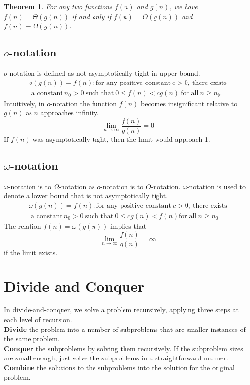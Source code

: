 \documentclass[]{book}
\newtheorem{theorem}{Theorem}[chapter]
\begin{document}
    \begin{theorem}
      For any two functions $f(n)$ and $g(n)$, we have $f(n) = \Theta(g(n))$
      if and only if $f(n) = O(g(n))$ and $f(n) = \Omega(g(n))$.
    \end{theorem}

    \section{$o$-notation}
      $o$-notation is defined as not asymptotically tight in upper bound.
      \begin{multline*}
        o(g(n)) = f(n): \text{for any positive constant}\ c > 0,\ \text{there exists}\\\text{ a constant}\
        n_0 > 0\ \text{such that}\ 0 \leq f(n) < cg(n)\ \text{for all}\ n \geq n_0.
      \end{multline*}
      Intuitively, in $o$-notation the function $f(n)$ becomes insignificant relative
      to $g(n)$ as $n$ approaches infinity.
      $$\lim_{n\to\infty} \dfrac{f(n)}{g(n)} = 0$$
      If $f(n)$ was asymptotically tight, then the limit would approach 1.

    \section{$\omega$-notation}
      $\omega$-notation is to $\Omega$-notation as $o$-notation is to $O$-notation. $\omega$-notation
      is used to denote a lower bound that is not asymptotically tight.
      \begin{multline*}
        \omega(g(n)) = f(n): \text{for any positive constant}\ c > 0,\ \text{there exists}\\\text{ a constant}\
        n_0 > 0\ \text{such that}\ 0 \leq cg(n) < f(n) \text{for all}\ n \geq n_0.
      \end{multline*}
      The relation $f(n) = \omega(g(n))$ implies that $$\lim_{n\to\infty} \dfrac{f(n)}{g(n)} = \infty$$
      if the limit exists.

  \chapter{Divide and Conquer}
    In divide-and-conquer, we solve a problem recursively, applying three steps
    at each level of recursion.\\

    \noindent\textbf{Divide} the problem into a number of subproblems that are smaller instances of the same problem.\medskip\\
    \textbf{Conquer} the subproblems by solving them recursively. If the subproblem sizes are small enough, just solve the subproblems
    in a straightforward manner.\medskip \\
    \textbf{Combine} the solutions to the subproblems into the solution for the original problem.
\end{document}
